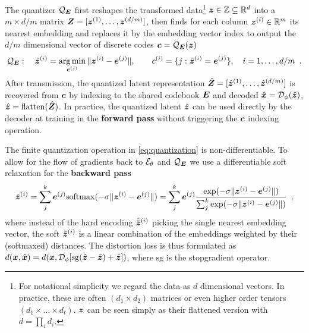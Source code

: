 \documentclass{article} %
\newcommand{\gEt}{\gE_\theta}
\newcommand{\gQE}{\gQ_\mE}
\newcommand{\gDp}{\gD_\phi}
\newcommand{\vzb}{\bar{\vz}}
\newcommand{\vzh}{\hat{\vz}}
\newcommand{\vzt}{\tilde{\vz}}
\newcommand{\vxh}{\hat{\vx}}
\begin{document}

The quantizer $\gQE$ first reshapes the transformed data\footnote{For notational simplicity we regard the data as $d$ dimensional vectors. In practice, these are often $(d_1 \times d_2)$ matrices or even higher order tensors $(d_1 \times \ldots \times d_t)$. ${\bm{z}}$ can be seen simply as their flattened version with $d = \prod_i d_i$.} ${\bm{z}} \in {\mathbb{Z}} \subseteq {\mathbb{R}}^{d}$ into a $m \times d/m$ matrix ${\bm{Z}} = [{\bm{z}}^{(1)}, \ldots, {\bm{z}}^{(d/m)}]$, then finds for each column ${\bm{z}}^{(i)} \in {\mathbb{R}}^m$ its nearest embedding and replaces it by the embedding vector index to output the $d/m$ dimensional vector of discrete codes $\vc = \gQE(\vz)$
\begin{align}\label{eq:quantization}
\gQE: \quad \vzh^{(i)} = \argmin_{\ve^{(j)}} \Vert \vz^{(i)} - \ve^{(j)} \Vert, \qquad \evc^{(i)} = \{j : \vzh^{(i)} = \ve^{(j)} \}, \quad i = 1, \ldots, d/m \enspace .
\end{align}
After transmission, the quantized latent representation $\hat{\mZ} = [\vzh^{(1)}, \ldots, \vzh^{(d/m)}]$ is recovered from ${\bm{c}}$ by indexing to the shared codebook ${\bm{E}}$ and decoded $\vxh = \gDp(\vzh)$, $\vzh = \mathrm{flatten}(\hat{\mZ})$. 
In practice, the quantized latent $\vzh$ can be used directly by the decoder at training in the \textbf{forward pass} without triggering the ${\bm{c}}$ indexing operation.


The finite quantization operation in \eqref{eq:quantization} is non-differentiable.
To allow for the flow of gradients back to $\gEt$ and $\gQE$ we use a differentiable soft relaxation for the \textbf{backward pass}
\begin{align}\label{eq:soft_quantization}
\vzt^{(i)} = \sum_j^k \ve^{(j)} \softmax(-\sigma \Vert \vz^{(i)} - \ve^{(j)} \Vert) = \sum_j^k \ve^{(j)} \frac{\exp(-\sigma \Vert \vz^{(i)} - \ve^{(j)} \Vert)}{\sum_j^k \exp(-\sigma \Vert \vz^{(i)} - \ve^{(j)} \Vert)} \enspace ,
\end{align}
where instead of the hard encoding $\hat{\vzb}^{(i)}$ picking the single nearest embedding vector, the soft $\vzt^{(i)}$ is a linear combination of the embeddings weighted by their (softmaxed) distances.
The distortion loss is thus formulated as $d(\vx, \vxh) = d(\vx, \gDp[\mathrm{sg}(\vzh - \vzt) + \vzt])$, where $\mathrm{sg}$ is the stopgradient operator. 
\end{document}
